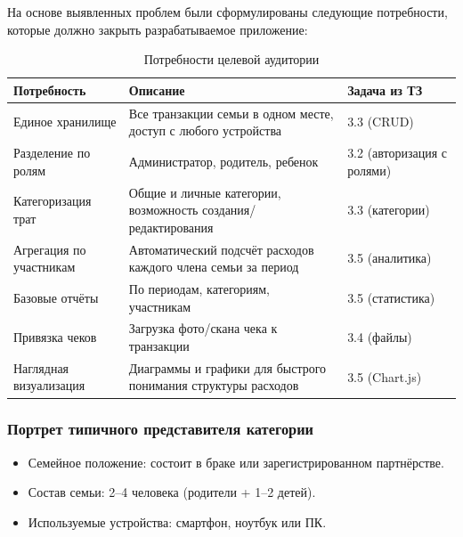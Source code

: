 На основе выявленных проблем были сформулированы следующие потребности, которые должно закрыть разрабатываемое приложение:

\begin{table}[h]
    \centering
    \caption{Потребности целевой аудитории}
    \label{tab:target-audience-needs}

    {\fontsize{12}{14}\selectfont
	\setlength{\tabcolsep}{6pt}

    \begin{tabular}{|p{4cm}|p{8cm}|p{3cm}|}
        \hline
        \textbf{Потребность} & \textbf{Описание} & \textbf{Задача из ТЗ} \\
        \hline
        Единое хранилище & Все транзакции семьи в одном месте, доступ с любого устройства & 3.3 (CRUD) \\
        \hline
        Разделение по ролям & Администратор, родитель, ребенок & 3.2 (авторизация с ролями) \\
        \hline
        Категоризация трат & Общие и личные категории, возможность создания/редактирования & 3.3 (категории) \\
        \hline
        Агрегация по участникам & Автоматический подсчёт расходов каждого члена семьи за период & 3.5 (аналитика) \\
        \hline
        Базовые отчёты & По периодам, категориям, участникам & 3.5 (статистика) \\
        \hline
        Привязка чеков & Загрузка фото/скана чека к транзакции & 3.4 (файлы) \\
        \hline
        Наглядная визуализация & Диаграммы и графики для быстрого понимания структуры расходов & 3.5 (Chart.js) \\
        \hline

    \end{tabular}
    }
\end{table}

\subsubsection{Портрет типичного представителя категории}

\begin{itemize}
    \item Семейное положение: состоит в браке или зарегистрированном партнёрстве.
    \item Состав семьи: 2–4 человека (родители + 1–2 детей).
    \item Используемые устройства: смартфон, ноутбук или ПК.
\end{itemize}

